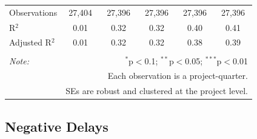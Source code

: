 \documentclass[
]{article}
\begin{document}
\begin{table}[H]
\begin{tabular}{@{\extracolsep{-2pt}}lccccc}
Observations & 27,404 & 27,396 & 27,396 & 27,396 & 27,396 \\ 
R$^{2}$ & 0.01 & 0.32 & 0.32 & 0.40 & 0.41 \\ 
Adjusted R$^{2}$ & 0.01 & 0.32 & 0.32 & 0.38 & 0.39 \\ 
\hline 
\hline \\[-1.8ex] 
\textit{Note:}  & \multicolumn{5}{r}{$^{*}$p$<$0.1; $^{**}$p$<$0.05; $^{***}$p$<$0.01} \\ 
 & \multicolumn{5}{r}{Each observation is a project-quarter.} \\ 
 & \multicolumn{5}{r}{SEs are robust and clustered at the project level.} \\ 
\end{tabular} 
\end{table}

\hypertarget{negative-delays}{%
\subsection{Negative Delays}\label{negative-delays}}
\end{document}
